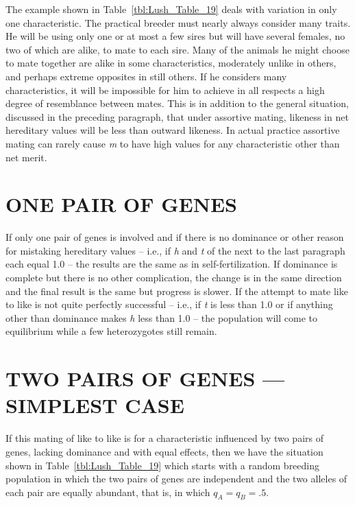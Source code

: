 The example shown in Table~\ref{tbl:Lush_Table_19} deals with
variation in only one characteristic. The practical breeder must
nearly always consider many traits. He will be using only one or
at most a few sires but will have several females, no two of which
are alike, to mate to each sire. Many of the animals he might
choose to mate together are alike in some characteristics,
moderately unlike in others, and perhaps extreme opposites
in still others. If he considers many characteristics, it will
be impossible for him to achieve in all respects a high degree of
resemblance between mates. This is in addition to the general
situation, discussed in the preceding paragraph, that under
assortive mating, likeness in net hereditary values will be less
than outward likeness. In actual practice assortive mating can
rarely cause \textit{m} to have high values for any characteristic
other than net merit.

\section*{ONE PAIR OF GENES}

If only one pair of genes is involved and if there is no dominance or
other reason for mistaking hereditary values -- i.e., if \textit{h}
and \textit{t} of the next to the last paragraph each equal 1.0 -- the
results are the same as in self-fertilization. If dominance is complete
but there is no other complication, the change is in the same direction
and the final result is the same but progress is slower. If the attempt
to mate like to like is not quite perfectly successful -- i.e., if
\textit{t} is less than 1.0 or if anything other than dominance makes
\textit{h} less than 1.0 -- the population will come to equilibrium
while a few heterozygotes still remain.

\section*{TWO PAIRS OF GENES --- SIMPLEST CASE}

If this mating of like to like is for a characteristic influenced by two
pairs of genes, lacking dominance and with equal effects, then we have
the situation shown in Table~\ref{tbl:Lush_Table_19} which starts with a
random breeding population in which the two pairs of genes are independent
and the two alleles of each pair are equally abundant, that is, in which
$q_A = q_B = .5$.

